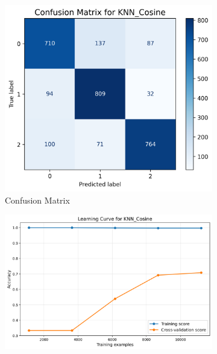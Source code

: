 \documentclass[10pt]{article}
\begin{document}
    \begin{figure}[!ht]
        \begin{subfigure}{0.33\textwidth}
            \centering
            \includegraphics[width=\textwidth]{code/ResultsMainAugZip/plots/Block3_Probabilistic_Experiment_I/confusion_matrix_KNN_Cosine.png}
            \caption{Confusion Matrix}
        \end{subfigure}
        \begin{subfigure}{0.33\textwidth}
            \centering
            \includegraphics[width=\textwidth]{code/ResultsMainAugZip/plots/Block3_Probabilistic_Experiment_I/learning_curve_KNN_Cosine.png}

\end{subfigure}
\end{figure}
\end{document}
